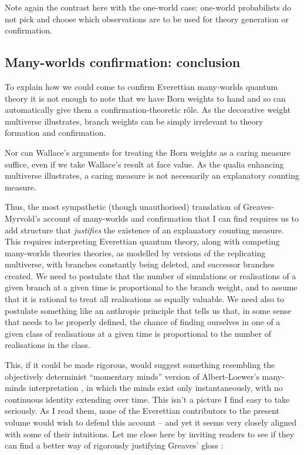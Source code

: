 \documentclass[aps,
pra,epsfig,12pt,nofootinbib]{revtex4}
\begin{document}
Note again the contrast here with the one-world case:
one-world probabilists do not pick and choose which observations 
are to be used for theory generation or confirmation.  

\subsection{Many-worlds confirmation: conclusion}

To explain how we could come to confirm Everettian many-worlds
quantum theory it is not enough to note that we have Born
weights to hand and so can automatically give them a 
confirmation-theoretic r\^{o}le.   As the decorative weight multiverse 
illustrates, branch weights can be simply irrelevant to 
theory formation and confirmation.   
  
Nor can Wallace's arguments for treating the 
Born weights as a caring measure suffice, even if we take Wallace's
result at face value.  As the qualia enhancing multiverse
illustrates, a caring measure is not necessarily an explanatory 
counting measure.  

Thus, the most sympathetic (though unauthorised) 
translation of Greaves-Myrvold's 
account of many-worlds and confirmation that I can find requires us
to add structure that {\it justifies} the existence of an 
explanatory counting measure.   This requires interpreting 
Everettian quantum theory, along with competing many-worlds theories
theories, as modelled by versions of the replicating multiverse,
with branches constantly being deleted, and successor branches
created.  We need to postulate that the number of 
simulations or realisations of a given branch at a given 
time is proportional to the branch weight, and to assume 
that it is rational to treat all realisations as equally valuable.
We need also to postulate something like an
anthropic principle that tells us that, in some sense that
needs to be properly defined, the chance of finding ourselves in 
one of a given class of realisations at a given time is proportional 
to the number of realisations in the class.  

This, if it could be made rigorous, would suggest something resembling 
the objectively determinist 
``momentary minds'' version of Albert-Loewer's many-minds 
interpretation \cite{almanyminds,bellmw,barbour}, 
in which the minds exist only instantaneously, with no continuous
identity extending over time.   This isn't a picture I find easy to take
seriously.    As I read them, none of the Everettian 
contributors to the present volume would 
wish to defend this account -- and yet it seems very closely aligned with 
some of their intuitions.  Let me close here by inviting 
readers to see if they can find a better
way of rigorously justifying Greaves' gloss \cite{greaves}:
\end{document}
